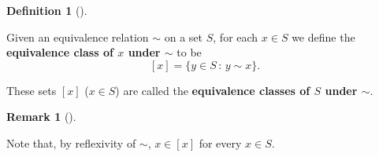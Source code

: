 \documentclass[10pt,]{book}
\newcommand{\terminology}[1]{\textbf{#1}}
\theoremstyle{plain}
\theoremstyle{definition}
\newtheorem{definition}[theorem]{Definition}
\theoremstyle{definition}
\newtheorem{remark}[theorem]{Remark}
\theoremstyle{definition}
\theoremstyle{definition}
\numberwithin{equation}{section}
\begin{document}
\begin{definition}[{}]\label{definition-56}

        Given an equivalence relation \(\sim\) on a set \(S\), for
        each \(x\in S\) we define the \terminology{equivalence class of \(x\) under
        \(\sim\)} to be
\begin{equation*}

          [x]=\{y\in S\,:\, y\sim x\}.
        
\end{equation*}

\par

        These sets \([x]\) (\(x\in S\)) are
        called the \terminology{equivalence classes of \(S\) under \(\sim\)}.
\label{notation-63}
\end{definition}
\begin{remark}[]\label{remark-36}

      Note that, by reflexivity of \(\sim\), \(x\in [x]\)
      for every \(x\in S\).
\end{remark}
\par
\end{document}

